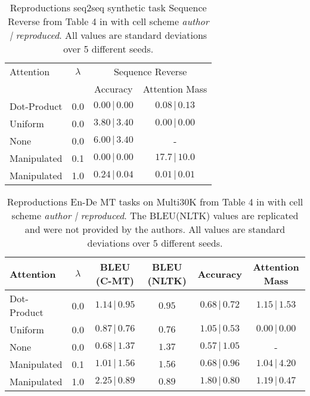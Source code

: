 \begin{table}[h!]
\centering
\caption{Reproductions seq2seq synthetic task Sequence Reverse from Table 4 in \citet{pruthi-etal-2020-learning} with cell scheme \textit{author | reproduced}. All values are standard deviations over 5 different seeds.}
\label{tab:seq-to-seq-stdv-2}
\begin{tabular}{lccc} 
\toprule
Attention   & $\lambda$ & \multicolumn{2}{c}{Sequence Reverse}           \\ 
\cline{3-4}
            &           & Accuracy                 & Attention Mass                  \\ 
\midrule
Dot-Product & 0.0       & $0.00\pmb{\,|\,}0.00$ & $0.08\pmb{\,|\,}0.13$  \\ 
\midrule
Uniform     & 0.0       & $3.80\pmb{\,|\,}3.40$ & $0.00\pmb{\,|\,}0.00$  \\
None        & 0.0       & $6.00\pmb{\,|\,}3.40$ & -                      \\ 
\midrule
Manipulated & 0.1       & $0.00\pmb{\,|\,}0.00$ & $17.7\pmb{\,|\,}10.0$  \\
Manipulated & 1.0       & $0.24\pmb{\,|\,}0.04$ & $0.01\pmb{\,|\,}0.01$  \\
\bottomrule
\end{tabular}
\end{table}

\begin{table}[h!]
    \caption{Reproductions En-De MT tasks on Multi30K from Table 4 in \citep{pruthi-etal-2020-learning} with cell scheme \textit{author | reproduced}. The BLEU(NLTK) values are replicated and were not provided by the authors. All values are standard deviations over 5 different seeds.}
    \label{tab:seq-to-seq translation results stdv}
    \centering
    \begin{tabular}{lccccc}
    \toprule
      Attention & $\lambda$  & BLEU (C-MT)  & BLEU (NLTK) & Accuracy & Attention Mass\\
      \midrule
      Dot-Product   & 0.0 & $1.14\pmb{\,|\,}0.95$ & $0.95$ & $0.68\pmb{\,|\,}0.72$ & $1.15\pmb{\,|\,}1.53$
      \\
      \midrule
      Uniform   & 0.0 & $0.87\pmb{\,|\,}0.76$ & $0.76$ & $1.05\pmb{\,|\,}0.53$ & $0.00\pmb{\,|\,}0.00$
      \\
      None   & 0.0 & $0.68\pmb{\,|\,}1.37$ & $1.37$ & $0.57\pmb{\,|\,}1.05$ & -
      \\
      \midrule
      Manipulated   & 0.1 & $1.01\pmb{\,|\,}1.56$ & $1.56$ & $0.68\pmb{\,|\,}0.96$ & $1.04\pmb{\,|\,}4.20$
      \\
      Manipulated   & 1.0 & $2.25\pmb{\,|\,}0.89$ & $0.89$ & $1.80\pmb{\,|\,}0.80$ & $1.19\pmb{\,|\,}0.47$
    \\
    \bottomrule
    \end{tabular}
\end{table}
